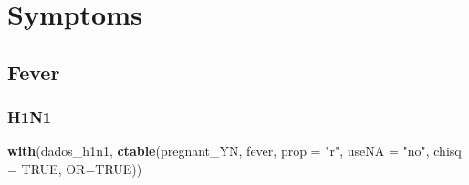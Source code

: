 \documentclass[
]{article}
\newenvironment{Shaded}{\begin{snugshade}}{\end{snugshade}}
\newcommand{\DataTypeTok}[1]{\textcolor[rgb]{0.13,0.29,0.53}{#1}}
\newcommand{\DecValTok}[1]{\textcolor[rgb]{0.00,0.00,0.81}{#1}}
\newcommand{\KeywordTok}[1]{\textcolor[rgb]{0.13,0.29,0.53}{\textbf{#1}}}
\newcommand{\NormalTok}[1]{#1}
\newcommand{\OperatorTok}[1]{\textcolor[rgb]{0.81,0.36,0.00}{\textbf{#1}}}
\newcommand{\OtherTok}[1]{\textcolor[rgb]{0.56,0.35,0.01}{#1}}
\newcommand{\StringTok}[1]{\textcolor[rgb]{0.31,0.60,0.02}{#1}}
\begin{document}
\hypertarget{symptoms}{%
\section{Symptoms}\label{symptoms}}

\hypertarget{fever}{%
\subsection{Fever}\label{fever}}

\hypertarget{h1n1-11}{%
\subsubsection{H1N1}\label{h1n1-11}}

\begin{Shaded}
\end{Shaded}

\begin{Shaded}
\begin{Highlighting}[]
\KeywordTok{with}\NormalTok{(dados_h1n1, }\KeywordTok{ctable}\NormalTok{(pregnant_YN, fever, }\DataTypeTok{prop =} \StringTok{"r"}\NormalTok{, }\DataTypeTok{useNA =} \StringTok{"no"}\NormalTok{, }\DataTypeTok{chisq =} \OtherTok{TRUE}\NormalTok{, }\DataTypeTok{OR=}\OtherTok{TRUE}\NormalTok{))}
\end{Highlighting}
\end{Shaded}
\end{document}
